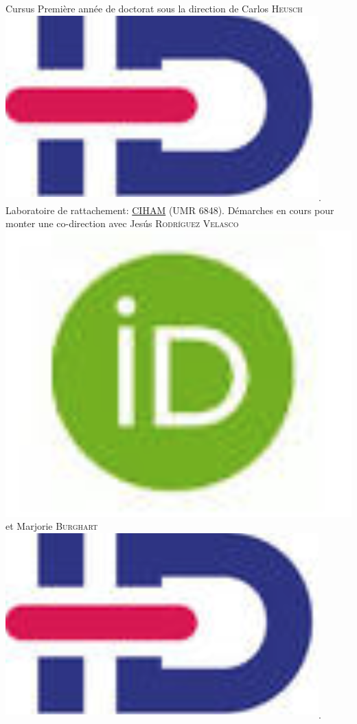  \begin{rubric}{Cursus}
                                \entry*[2018-2019]
                            Première année de doctorat sous la direction de Carlos \textsc{Heusch}\href{https://www.idref.fr/055838413}{\textsuperscript{\includegraphics[scale=0.025]{img/idref.png}}}. Laboratoire de
                        rattachement: \href{http://ciham.ish-lyon.cnrs.fr/}{CIHAM} (UMR
                        6848). Démarches en cours pour monter une co-direction avec Jesús \textsc{Rodríguez Velasco}\href{https://orcid.org/0000-0002-3848-9230}{\includegraphics[scale=0.025]{img/orcid.png}} et
                        Marjorie \textsc{Burghart}\href{https://www.idref.fr/178995819}{\textsuperscript{\includegraphics[scale=0.025]{img/idref.png}}}.
                    

\end{rubric}
